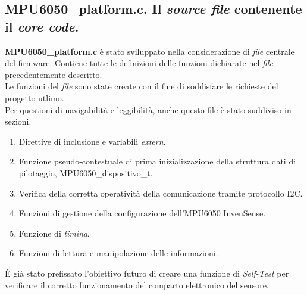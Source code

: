 \documentclass[11pt]{report}
\begin{document}
\newpage

\newpage

\subsection{MPU6050\_platform.c. Il \textit{source file} contenente il \textit{core code}.}
\textbf{MPU6050\_platform.c} è stato sviluppato nella considerazione di \textit{file} centrale del firmware. Contiene tutte le definizioni delle funzioni dichiarate nel \textit{file} precedentemente descritto.\\
Le funzioni del \textit{file} sono state create con il fine di soddisfare le richieste del progetto utlimo.\\
Per questioni di navigabilità e leggibilità, anche questo file è stato suddiviso in sezioni.\\
\begin{enumerate}
    \item Direttive di inclusione e variabili \textit{extern}.
    \item Funzione pseudo-contestuale di prima inizializzazione della struttura dati di pilotaggio, MPU6050\_dispositivo\_t.
    \item Verifica della corretta operatività della comunicazione tramite protocollo I2C.
    \item Funzioni di gestione della configurazione dell'MPU6050 InvenSense.
    \item Funzione di \textit{timing}.
    \item Funzioni di lettura e manipolazione delle informazioni.
\end{enumerate}
È già stato prefissato l'obiettivo futuro di creare una funzione di \textit{Self-Test} per verificare il corretto funzionamento del comparto elettronico del sensore.
\end{document}
